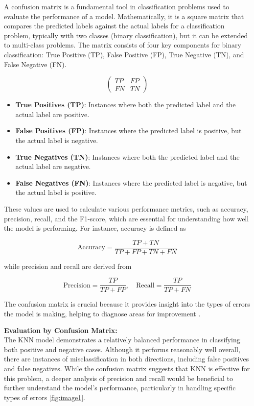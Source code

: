 \documentclass[pdflatex,sn-nature,Numbered]{sn-jnl}%
\theoremstyle{thmstyleone}%
\theoremstyle{thmstyletwo}%
\theoremstyle{thmstylethree}%
\begin{document}
A confusion matrix is a fundamental tool in classification problems used to evaluate the performance of a model. Mathematically, it is a square matrix that compares the predicted labels against the actual labels for a classification problem, typically with two classes (binary classification), but it can be extended to multi-class problems. The matrix consists of four key components for binary classification: True Positive (TP), False Positive (FP), True Negative (TN), and False Negative (FN).

\[
\begin{pmatrix}
    TP & FP \\
    FN & TN
\end{pmatrix}
\]

\begin{itemize}
    \item \textbf{True Positives (TP)}: Instances where both the predicted label and the actual label are positive.
    \item \textbf{False Positives (FP)}: Instances where the predicted label is positive, but the actual label is negative.
    \item \textbf{True Negatives (TN)}: Instances where both the predicted label and the actual label are negative.
    \item \textbf{False Negatives (FN)}: Instances where the predicted label is negative, but the actual label is positive.
\end{itemize}

These values are used to calculate various performance metrics, such as accuracy, precision, recall, and the F1-score, which are essential for understanding how well the model is performing. For instance, accuracy is defined as

\[
\text{Accuracy} = \frac{TP + TN}{TP + FP + TN + FN}
\]

while precision and recall are derived from

\[
\text{Precision} = \frac{TP}{TP + FP}, \quad \text{Recall} = \frac{TP}{TP + FN}
\]

The confusion matrix is crucial because it provides insight into the types of errors the model is making, helping to diagnose areas for improvement \cite{confusion_matrix_ref}.


\textbf{Evaluation by Confusion Matrix:} \\
The KNN model demonstrates a relatively balanced performance in classifying both positive and negative cases. Although it performs reasonably well overall, there are instances of misclassification in both directions, including false positives and false negatives. While the confusion matrix suggests that KNN is effective for this problem, a deeper analysis of precision and recall would be beneficial to further understand the model's performance, particularly in handling specific types of errors \autoref{fig:image1}.
\end{document}
